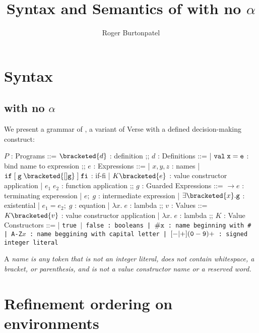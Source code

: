 \documentclass[]{article}
\title{Syntax and Semantics of \VMinus with no $\alpha$}
\author{Roger Burtonpatel}
\begin{document}
\maketitle

\section{Syntax}

\subsection{\VMinus with no $\alpha$}

We present a grammar of \VMinus, a variant of Verse with a defined
decision-making construct: 

\bigskip


\begin{center}
    \begin{bnf}
    $P$ : \textsf{Programs} ::=
    $\bracketed{d}$ : definition
    ;;
    $d$ : \textsf{Definitions} ::=
    | $\tt{val} \; x \; \tt{=} \; e$ : bind name to expression
    ;;
    $e$ : \textsf{Expressions} ::=
    | $x, y, z$ : names
    | $\tt{if} \; \tt{[}\; g \; \bracketed{[] g} \;\tt{]} \; \tt{fi}$ : if-fi 
    | $K \bracketed{e}$ : value constructor application 
    | $e_{1} \; e_{2}$ : function application 
    ;;
    $g$ : \textsf{Guarded Expressions} ::=  
    $\boldsymbol{\rightarrow}e$ : terminating experession
    | $e; \; g$ : intermediate expression 
    | $\exists \bracketed{x} \tt{.} g$ : existential 
    | $e_{1} = e_{2}; \; g$ : equation 
    | $\lambda x. \; e$ : lambda 
    ;;
    $v$ : Values ::= $K\bracketed{v}$ : value constructor application 
    | $\lambda x. \; e$ : lambda 
    ;;
    $K$ : \textsf{Value Constructors} ::=
    | \tt{true} $\vert$ \tt{false} : booleans
    | $\tt{\#}x$ : name beginning with \tt{\#}
    | \tt{A-Z}$x$ : name beggining with capital letter
    | $[\tt{-}\vert\tt{+}](\tt{0}-\tt{9})+$ : signed integer literal 
    \end{bnf}
\end{center}

A \it{name} is any token that is not an integer literal, 
does not contain whitespace, a bracket, or parenthesis, 
and is not a value constructor name or a reserved word.
        
\section{Refinement ordering on environments}
\end{document}
